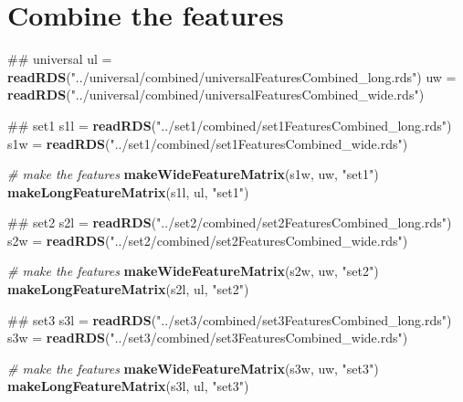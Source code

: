 \documentclass[10pt]{report}
\newenvironment{Shaded}{}{}
\newcommand{\KeywordTok}[1]{\textcolor[rgb]{0.00,0.44,0.13}{\textbf{{#1}}}}
\newcommand{\StringTok}[1]{\textcolor[rgb]{0.25,0.44,0.63}{{#1}}}
\newcommand{\CommentTok}[1]{\textcolor[rgb]{0.38,0.63,0.69}{\textit{{#1}}}}
\newcommand{\NormalTok}[1]{{#1}}
\begin{document}
\section{Combine the features}\label{combine-the-features}

\begin{Shaded}
\begin{Highlighting}[]
\NormalTok{## universal}
\NormalTok{ul =}\StringTok{ }\KeywordTok{readRDS}\NormalTok{(}\StringTok{"../universal/combined/universalFeaturesCombined_long.rds"}\NormalTok{)}
\NormalTok{uw =}\StringTok{ }\KeywordTok{readRDS}\NormalTok{(}\StringTok{"../universal/combined/universalFeaturesCombined_wide.rds"}\NormalTok{)}

\NormalTok{## set1}
\NormalTok{s1l =}\StringTok{ }\KeywordTok{readRDS}\NormalTok{(}\StringTok{"../set1/combined/set1FeaturesCombined_long.rds"}\NormalTok{)}
\NormalTok{s1w =}\StringTok{ }\KeywordTok{readRDS}\NormalTok{(}\StringTok{"../set1/combined/set1FeaturesCombined_wide.rds"}\NormalTok{)}

\CommentTok{# make the features}
\KeywordTok{makeWideFeatureMatrix}\NormalTok{(s1w, uw, }\StringTok{"set1"}\NormalTok{)}
\KeywordTok{makeLongFeatureMatrix}\NormalTok{(s1l, ul, }\StringTok{"set1"}\NormalTok{)}

\NormalTok{## set2}
\NormalTok{s2l =}\StringTok{ }\KeywordTok{readRDS}\NormalTok{(}\StringTok{"../set2/combined/set2FeaturesCombined_long.rds"}\NormalTok{)}
\NormalTok{s2w =}\StringTok{ }\KeywordTok{readRDS}\NormalTok{(}\StringTok{"../set2/combined/set2FeaturesCombined_wide.rds"}\NormalTok{)}

\CommentTok{# make the features}
\KeywordTok{makeWideFeatureMatrix}\NormalTok{(s2w, uw, }\StringTok{"set2"}\NormalTok{)}
\KeywordTok{makeLongFeatureMatrix}\NormalTok{(s2l, ul, }\StringTok{"set2"}\NormalTok{)}

\NormalTok{## set3}
\NormalTok{s3l =}\StringTok{ }\KeywordTok{readRDS}\NormalTok{(}\StringTok{"../set3/combined/set3FeaturesCombined_long.rds"}\NormalTok{)}
\NormalTok{s3w =}\StringTok{ }\KeywordTok{readRDS}\NormalTok{(}\StringTok{"../set3/combined/set3FeaturesCombined_wide.rds"}\NormalTok{)}

\CommentTok{# make the features}
\KeywordTok{makeWideFeatureMatrix}\NormalTok{(s3w, uw, }\StringTok{"set3"}\NormalTok{)}
\KeywordTok{makeLongFeatureMatrix}\NormalTok{(s3l, ul, }\StringTok{"set3"}\NormalTok{)}
\end{Highlighting}
\end{Shaded}
\end{document}
